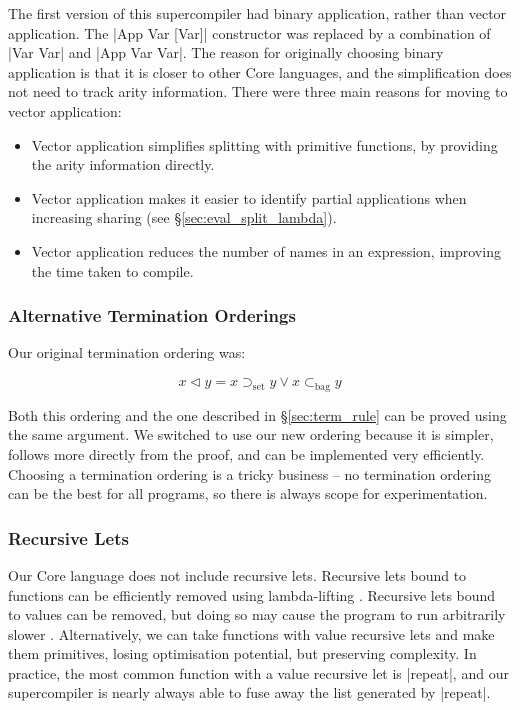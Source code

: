 \documentclass[draft]{sigplanconf}
\newcommand{\setsup}{\supset_{\mathrm{set}}}
\newcommand{\bagsub}{\subset_{\mathrm{bag}}}
\begin{document}
The first version of this supercompiler had binary application, rather than vector application. The |App Var [Var]| constructor was replaced by a combination of |Var Var| and |App Var Var|. The reason for originally choosing binary application is that it is closer to other Core languages, and the simplification does not need to track arity information. There were three main reasons for moving to vector application:

\begin{itemize}
\item Vector application simplifies splitting with primitive functions, by providing the arity information directly.
\item Vector application makes it easier to identify partial applications when increasing sharing (see \S\ref{sec:eval_split_lambda}).
\item Vector application reduces the number of names in an expression, improving the time taken to compile.
\end{itemize}

\subsubsection{Alternative Termination Orderings}

Our original termination ordering was:

\vspace{-\bigskipamount}

\[
x \lhd y = x \setsup y \vee x \bagsub y
\]

Both this ordering and the one described in \S\ref{sec:term_rule} can be proved using the same argument. We switched to use our new ordering because it is simpler, follows more directly from the proof, and can be implemented very efficiently. Choosing a termination ordering is a tricky business -- no termination ordering can be the best for all programs, so there is always scope for experimentation.

\subsubsection{Recursive Lets}

Our Core language does not include recursive lets. Recursive lets bound to functions can be efficiently removed using lambda-lifting \cite{lambda_lift}. Recursive lets bound to values can be removed, but doing so may cause the program to run arbitrarily slower \cite{me:thesis}. Alternatively, we can take functions with value recursive lets and make them primitives, losing optimisation potential, but preserving complexity. In practice, the most common function with a value recursive let is |repeat|, and our supercompiler is nearly always able to fuse away the list generated by |repeat|.
\end{document}
